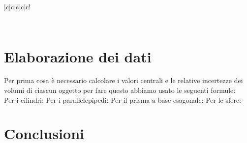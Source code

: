 \documentclass{article}
\begin{document}
\begin{table}[h]
{\begin{tabular}{ |c|c|c|c|c! }
            \hline
        \end{tabular}}\\
        \caption{Misure delle dimensioni.}
        \label{tab:dati}
    \end{table}

    \section{Elaborazione dei dati}
    Per prima cosa è necessario calcolare i valori centrali e le relative incertezze dei
    volumi di ciascun oggetto per fare questo abbiamo usato le seguenti formule:\\
    Per i cilindri:
    Per i parallelepipedi:
    Per il prisma a base esagonale:
    Per le sfere:
    \section{Conclusioni}
\end{document}
